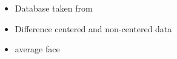 
\begin{itemize}
  \item Database taken from \cite{georghiades2001few}
  \item Difference centered and non-centered data
  \item average face
\end{itemize}
